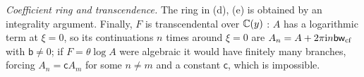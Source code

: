 \emph{Coefficient ring and transcendence.} The ring in \textup{(d)}, \textup{(e)} is obtained by an integrality argument. Finally, $F$ is transcendental over $\mathbb{C}(y)$ : $A$ has a logarithmic term at $\xi=0$, so its continuations $n$ times around $\xi=0$ are $A_n=A+2\pi\mathrm{i} n\mathsf{b}\mathsf{w}_{\mathrm{cf}}$ with $\mathsf{b}\neq0$; if $F=\theta\log A$ were algebraic it would have finitely many branches, forcing $A_n=\mathsf{c}A_m$ for some $n\neq m$ and a constant $\mathsf{c}$, which is impossible.
